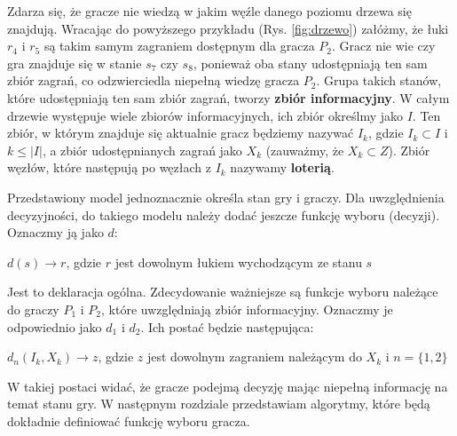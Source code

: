 Zdarza się, że gracze nie wiedzą w jakim węźle danego poziomu drzewa się znajdują. Wracając do powyższego przykładu (Rys. \ref{fig:drzewo}) załóżmy, że łuki $r_4$ i $r_5$ są takim samym zagraniem dostępnym dla gracza $P_2$. Gracz nie wie czy gra znajduje się w stanie $s_7$ czy $s_8$, ponieważ oba stany udostępniają ten sam zbiór zagrań, co odzwierciedla niepełną wiedzę gracza $P_2$. Grupa takich stanów, które udostępniają ten sam zbiór zagrań, tworzy \textbf{zbiór informacyjny}. W całym drzewie występuje wiele zbiorów informacyjnych, ich zbiór określmy jako $I$. Ten zbiór, w którym znajduje się aktualnie gracz będziemy nazywać $I_k$, gdzie $I_k \subset I$ i $k \leq |I|$, a zbiór udostępnianych zagrań jako $X_k$ (zauważmy, że $X_k \subset Z$). Zbiór węzłów, które następują po węzłach z $I_k$ nazywamy \textbf{loterią}.

Przedstawiony model jednoznacznie określa stan gry i graczy. Dla uwzględnienia decyzyjności, do takiego modelu należy dodać jeszcze funkcję wyboru (decyzji). Oznaczmy ją jako $d$:
\begin{center}
	$d(s) \rightarrow r$, gdzie $r$ jest dowolnym łukiem wychodzącym ze stanu $s$
\end{center}

Jest to deklaracja ogólna. Zdecydowanie ważniejsze są funkcje wyboru należące do graczy $P_1$ i $P_2$, które uwzględniają zbiór informacyjny. Oznaczmy je odpowiednio jako $d_1$ i $d_2$. Ich postać będzie następująca:

\begin{center}
	$d_n(I_k, X_k) \rightarrow z$, gdzie $z$ jest dowolnym zagraniem należącym do $X_k$ i $n = \{1, 2\}$
\end{center}
W takiej postaci widać, że gracze podejmą decyzję mając niepełną informację na temat stanu gry. W następnym rozdziale przedstawiam algorytmy, które będą dokładnie definiować funkcję wyboru gracza.
